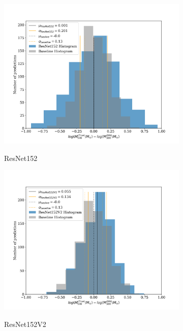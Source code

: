 \begin{figure}[H]
\begin{subfigure}{.325\textwidth}
    \includegraphics[width=\linewidth]{images/Chapter4/Results/test_ResNet152_hist.png}
    \label{fig:test_ResNet152_hist}
    \caption{ResNet152}
\end{subfigure}
\begin{subfigure}{.325\textwidth}
    \centering
    \includegraphics[width=\linewidth]{images/Chapter4/Results/test_ResNet152V2_hist.png}
    \label{fig:test_ResNet152V2_hist}
    \caption{ResNet152V2}
\end{subfigure}
\begin{subfigure}{.325\textwidth}
    \centering

\end{subfigure}
\end{figure}
